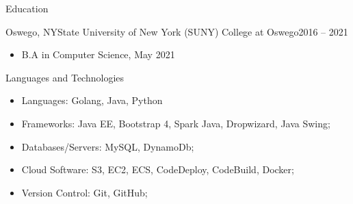 \documentclass[]{johnsoncv}
\begin{document}
	\makeheader
	
	
	\begin{cvsection}{Education}
		\begin{cvsubsection}{Oswego, NY}{State University of New York (SUNY) College at Oswego}{2016 – 2021}
			\begin{itemize}
				\item B.A in Computer Science, May 2021
			\end{itemize}
		\end{cvsubsection}
	\end{cvsection}

	\begin{cvsection}{Languages and Technologies}
		\begin{cvsubsection}{}{}{}	
			\begin{itemize}
				\item Languages: Golang, Java, Python
				\item Frameworks: Java EE, Bootstrap 4, Spark Java, Dropwizard, Java Swing;
				\item Databases/Servers: MySQL, DynamoDb;
				\item Cloud Software: S3, EC2, ECS, CodeDeploy, CodeBuild, Docker;
				\item Version Control: Git, GitHub;
			\end{itemize}
		\end{cvsubsection}
	\end{cvsection}
\end{document}
